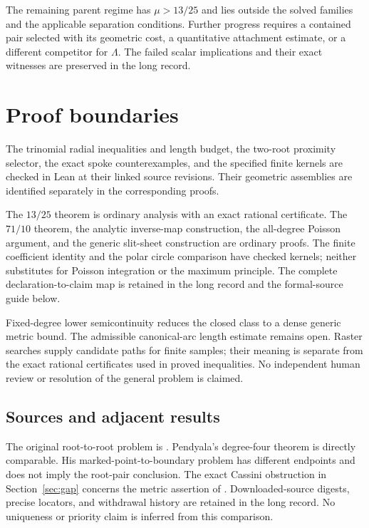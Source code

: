 \documentclass[11pt]{article}
\begin{document}
The remaining parent regime has $\mu>13/25$ and lies outside the solved
families and the applicable separation conditions.  Further progress requires
a contained pair selected with its geometric cost, a quantitative attachment
estimate, or a different competitor for $\Lambda$.  The failed scalar
implications and their exact witnesses are preserved in the long record.

\section{Proof boundaries}\label{sec:evidence-ledger}

The trinomial radial inequalities and length budget, the two-root proximity
selector, the exact spoke counterexamples, and the specified finite kernels
are checked in Lean at their linked source revisions.  Their geometric
assemblies are identified separately in the corresponding proofs.

The $13/25$ theorem is ordinary analysis with an exact rational certificate.
The $71/10$ theorem, the analytic inverse-map construction, the all-degree
Poisson argument, and the generic slit-sheet construction are ordinary
proofs.  The finite coefficient identity and the polar circle comparison
have checked kernels; neither substitutes for Poisson integration or the
maximum principle.  The complete declaration-to-claim map is retained in the
long record and the formal-source guide below.

Fixed-degree lower semicontinuity reduces the closed class to a dense generic
metric bound.  The admissible canonical-arc length estimate remains open.
Raster searches supply candidate paths for finite samples; their meaning is
separate from the exact rational certificates used in proved inequalities.
No independent human review or resolution of the general problem is claimed.

\subsection*{Sources and adjacent results}\label{sec:1041-sources}

The original root-to-root problem is \cite[p.~139, Problem~5]{ehp1958}.
Pendyala's degree-four theorem \cite[Thm.~1]{june2026} is directly comparable.
His marked-point-to-boundary problem \cite{pendyala2026shortest} has different
endpoints and does not imply the root-pair conclusion.  The exact Cassini
obstruction in Section~\ref{sec:gap} concerns the metric assertion of
\cite[Prop.~12]{march2026}.  Downloaded-source digests, precise locators,
and withdrawal history are retained in the long record.  No uniqueness or
priority claim is inferred from this comparison.
\end{document}
